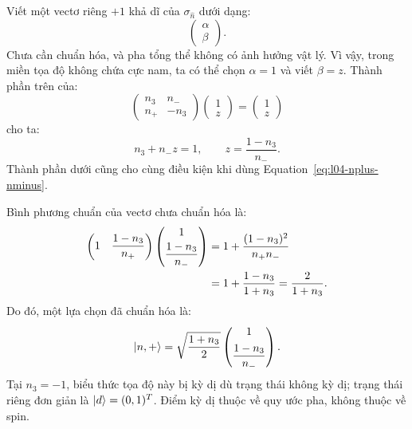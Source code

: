 Viết một vectơ riêng \(+1\) khả dĩ của \(\sigma_{\hat n}\) dưới dạng:
\begin{equation}
  \begin{pmatrix}\alpha\\\beta\end{pmatrix}.
\end{equation}
Chưa cần chuẩn hóa, và pha tổng thể không có ảnh hưởng vật lý. Vì vậy, trong miền tọa độ không chứa cực nam, ta có thể chọn \(\alpha=1\) và viết \(\beta=z\). Thành phần trên của:
\begin{equation}
  \begin{pmatrix}
    n_3&n_-\\
    n_+&-n_3
  \end{pmatrix}
  \begin{pmatrix}1\\z\end{pmatrix}
  =
  \begin{pmatrix}1\\z\end{pmatrix}
\end{equation}
cho ta:
\begin{equation}
  n_3+n_-z=1,
  \qquad
  z=\frac{1-n_3}{n_-}.
  \label{eq:l04-z-solution}
\end{equation}
Thành phần dưới cũng cho cùng điều kiện khi dùng Equation~\eqref{eq:l04-nplus-nminus}.

Bình phương chuẩn của vectơ chưa chuẩn hóa là:
\begin{align}
  \begin{pmatrix}
    1&\dfrac{1-n_3}{n_+}
  \end{pmatrix}
  \begin{pmatrix}
    1\\[3pt]\dfrac{1-n_3}{n_-}
  \end{pmatrix}
  &=
  1+\frac{(1-n_3)^2}{n_+n_-}
  \notag\\
  &=
  1+\frac{1-n_3}{1+n_3}
  =
  \frac{2}{1+n_3}.
  \label{eq:l04-unnormalized-norm}
\end{align}
Do đó, một lựa chọn đã chuẩn hóa là:
\begin{equation}
  \left\lvert n,+\right\rangle
  =
  \sqrt{\frac{1+n_3}{2}}
  \begin{pmatrix}
    1\\[5pt]\dfrac{1-n_3}{n_-}
  \end{pmatrix}.
  \label{eq:l04-normalized-n-state}
\end{equation}
Tại \(n_3=-1\), biểu thức tọa độ này bị kỳ dị dù trạng thái không kỳ dị; trạng thái riêng đơn giản là \(\left\lvert d\right\rangle=(0,1)^T\). Điểm kỳ dị thuộc về quy ước pha, không thuộc về spin.

